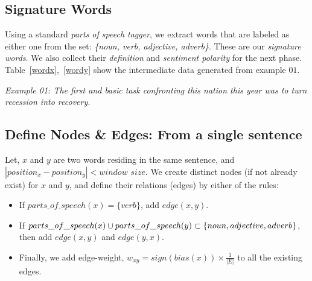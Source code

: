 \documentclass[a4paper]{report}
\begin{document}
\subsection{Signature Words}
Using a standard {\em parts of speech tagger}, we extract words that are labeled as either one from the set: {\em \{noun, verb, adjective, adverb\}}. These are our {\em signature words}. We also collect their {\em definition} and {\em sentiment polarity} for the next phase.
Table~\ref{wordx},~\ref{wordy} show the intermediate data generated from example $01$. 
\par {\em Example 01: The first and basic task confronting this nation this year was to turn recession into recovery.}  
\subsection{Define Nodes \& Edges: From a single sentence}
Let, $x$ and $y$ are two words residing in the same sentence, and $|position_x - position_y| < window$ $size$. We create distinct nodes (if not already exist) for $x$ and $y$, and define their relations (edges) by either of the rules:
\begin{small}
\begin{itemize}%
\item If $parts\_of\_speech(x) = \{verb\}$, add $edge(x,y)$. 
\item If $parts\_of\_speech(x) \cup parts\_of\_speech(y) \\ \subset \{noun, adjective,adverb\}$, then 
 add $edge(x,y)$ and $edge(y,x)$.
\item Finally, we add edge-weight, $w_{xy} = sign(bias(x))\times\frac{1}{|E|} $ to all the existing edges.
\end{itemize}\end{small}
\end{document}
